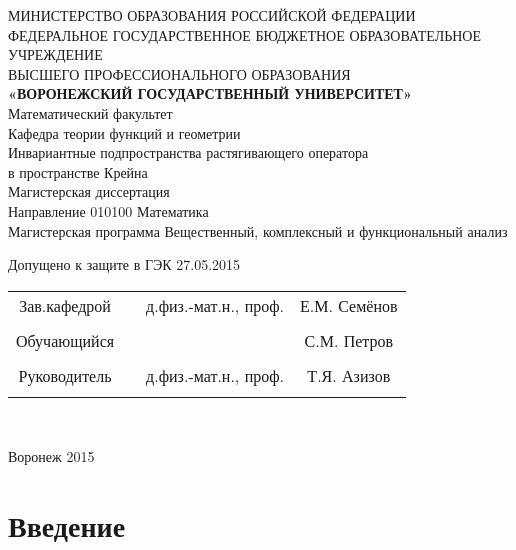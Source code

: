 \documentclass[a4paper]{article}
\newcommand{\universityname}{ВОРОНЕЖСКИЙ ГОСУДАРСТВЕННЫЙ УНИВЕРСИТЕТ}
\newcommand{\facultyname}{Математический факультет}
\newcommand{\departmentname}{Кафедра теории функций и  геометрии}
\newcommand{\thesistitle}{Инвариантные подпространства растягивающего оператора\\ в пространстве Крейна}
\newcommand{\thesisdirection}{010100 Математика}
\newcommand{\programname}{Вещественный, комплексный и функциональный анализ}
\newcommand{\defenseDate}{27.05.2015}
\newcommand{\studentName}{С.М. Петров}
\newcommand{\supervisorName}{Т.Я. Азизов}
\newcommand{\supervisorDegree}{д.физ.-мат.н., проф.}
\newcommand{\departmentHeadName}{Е.М. Семёнов}
\newcommand{\departmentHeadDegree}{д.физ.-мат.н.,  проф.}
\newcommand{\yearOfCompletion}{2015}
\begin{document}
 

\begin{center}
\hfill \break
\large{МИНИСТЕРСТВО ОБРАЗОВАНИЯ РОССИЙСКОЙ ФЕДЕРАЦИИ}\\
\footnotesize{ФЕДЕРАЛЬНОЕ ГОСУДАРСТВЕННОЕ БЮДЖЕТНОЕ ОБРАЗОВАТЕЛЬНОЕ УЧРЕЖДЕНИЕ}\\
\footnotesize{ВЫСШЕГО ПРОФЕССИОНАЛЬНОГО ОБРАЗОВАНИЯ}\\
\small{\textbf{«\universityname»}}\\
\hfill \break
\normalsize{\facultyname}\\
    \hfill \break
\normalsize{\departmentname}\\
\hfill\break
\hfill \break
\hfill \break
\hfill \break
\large{\thesistitle}\\
\hfill \break
\hfill \break
\hfill \break
\normalsize{Магистерская диссертация\\
\hfill \break
Направление  \thesisdirection\\
\hfill \break
Магистерская программа \programname}\\
\hfill \break
\hfill \break
\end{center}

\normalsize{ \hspace{28pt} Допущено к защите в ГЭК  \defenseDate} \hfill \break
\hfill \break

\normalsize{
\begin{tabular}{cccc}
Зав.кафедрой & \underline{\hspace{3cm}} &  \departmentHeadDegree & \departmentHeadName \\\\
Обучающийся & \underline{\hspace{3cm}} & &\studentName \\\\
Руководитель & \underline{\hspace{3cm}}& \supervisorDegree & \supervisorName \\\\
\end{tabular}
}\\
\hfill \break
\hfill \break
\begin{center} Воронеж \yearOfCompletion \end{center}
\thispagestyle{empty} %


\newpage

\tableofcontents %
\newpage

\newpage
\section{Введение}
\end{document}
